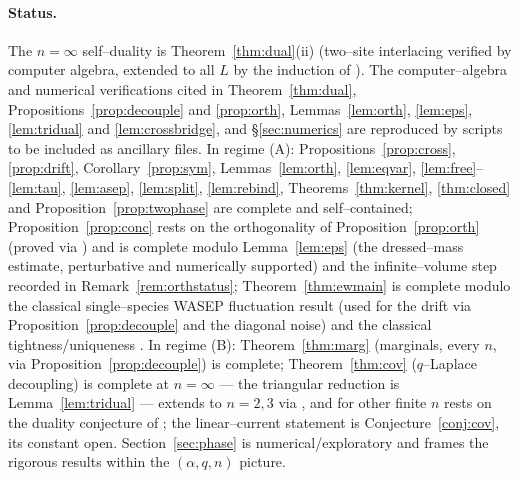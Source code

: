 \documentclass[11pt]{article}
\theoremstyle{plain}
\theoremstyle{definition}
\theoremstyle{remark}
\begin{document}
\paragraph{Status.} The $n=\infty$ self--duality is Theorem~\ref{thm:dual}(ii)
(two--site interlacing verified by computer algebra, extended to all $L$ by the
induction of \cite{REU}). The computer--algebra and numerical verifications cited in
Theorem~\ref{thm:dual}, Propositions~\ref{prop:decouple} and \ref{prop:orth},
Lemmas~\ref{lem:orth}, \ref{lem:eps}, \ref{lem:tridual} and \ref{lem:crossbridge}, and
\S\ref{sec:numerics} are reproduced by scripts to be included as ancillary files. In regime (A): Propositions~\ref{prop:cross},
\ref{prop:drift}, Corollary~\ref{prop:sym}, Lemmas~\ref{lem:orth}, \ref{lem:eqvar},
\ref{lem:free}--\ref{lem:tau}, \ref{lem:asep}, \ref{lem:split}, \ref{lem:rebind},
Theorems~\ref{thm:kernel}, \ref{thm:closed} and Proposition~\ref{prop:twophase} are
complete and self--contained; Proposition~\ref{prop:conc} rests on the orthogonality
of Proposition~\ref{prop:orth} (proved via \cite{CFG20}) and is complete modulo
Lemma~\ref{lem:eps} (the dressed--mass estimate, perturbative and numerically
supported) and the infinite--volume step recorded in Remark~\ref{rem:orthstatus}; Theorem~\ref{thm:ewmain} is complete modulo the classical
single--species WASEP fluctuation result (used for the drift via
Proposition~\ref{prop:decouple} and the diagonal noise) and the classical
tightness/uniqueness \cite{KL}. In regime
(B): Theorem~\ref{thm:marg} (marginals, every $n$, via
Proposition~\ref{prop:decouple}) is complete; Theorem~\ref{thm:cov} ($q$--Laplace
decoupling) is complete at $n=\infty$ --- the triangular reduction is
Lemma~\ref{lem:tridual} --- extends to $n=2,3$ via \cite{REU}, and for other finite
$n$ rests on the duality conjecture of \cite[Rmk.~4]{REU}; the linear--current
statement is Conjecture~\ref{conj:cov}, its constant open. Section~\ref{sec:phase} is numerical/exploratory and frames the rigorous
results within the $(\alpha,q,n)$ picture.
\end{document}
